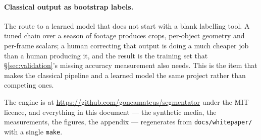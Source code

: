 \paragraph{Classical output as bootstrap labels.} The route to a learned model
that does not start with a blank labelling tool. A tuned chain over a season of
footage produces crops, per-object geometry and per-frame scalars; a human
correcting that output is doing a much cheaper job than a human producing it, and
the result is the training set that §\ref{sec:validation}'s missing accuracy
measurement also needs. This is the item that makes the classical pipeline and a
learned model the same project rather than competing ones.

\bigskip
\noindent
The engine is at \url{https://github.com/goncamateus/segmentator} under the MIT
licence, and everything in this document --- the synthetic media, the
measurements, the figures, the appendix --- regenerates from
\texttt{docs/whitepaper/} with a single \texttt{make}.
